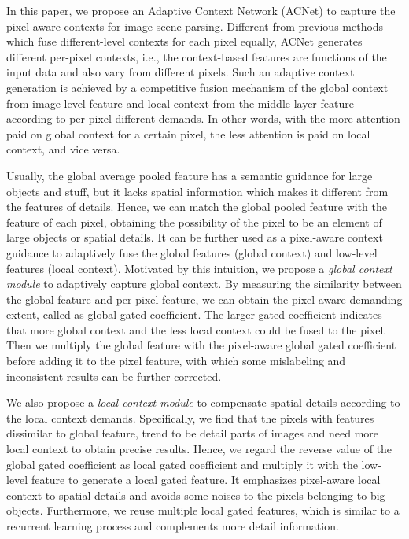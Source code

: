\documentclass[10pt,twocolumn,letterpaper]{article}
\begin{document}
In this paper, we propose an Adaptive Context Network (ACNet) to capture the pixel-aware contexts for image scene parsing. Different from previous methods which fuse different-level contexts for each pixel equally,
ACNet generates different per-pixel contexts, i.e., the context-based features are functions of the input data and also vary from different pixels. Such an adaptive context generation is achieved by a competitive fusion mechanism of the global context from image-level feature and local context from the middle-layer feature according to per-pixel different demands. In other words, with the more attention paid on global context for a certain pixel, the less attention is paid on local context, and vice versa. 

Usually, the global average pooled feature has a semantic guidance for large objects and stuff, but it lacks spatial information which makes it different from the features of details. Hence, we can match the global pooled feature with the feature of each pixel, obtaining the possibility of the pixel to be an element of large objects or spatial details. It can be further used as a pixel-aware context guidance to adaptively fuse the global features (global context) and low-level features (local context). 
Motivated by this intuition, we propose a \emph{global context module} to adaptively capture global context.  By measuring the similarity between the global feature and per-pixel feature, we can obtain the pixel-aware demanding extent, called as global gated coefficient. The larger gated coefficient indicates that more global context and the less local context could be fused to the pixel. Then we multiply the global feature with the pixel-aware global gated coefficient before adding it to the pixel feature, with which some mislabeling and inconsistent results can be further corrected. 



We also propose a \emph{local context module} to compensate spatial details according to the local context demands.
Specifically, we find that the pixels with features dissimilar to global feature, trend to be detail parts of images and need more local context to obtain precise results. Hence, we regard the reverse value of the  global gated coefficient as local gated coefficient and  multiply it with the low-level feature to generate a  local gated feature. It emphasizes pixel-aware local context to spatial details and avoids some noises to the pixels belonging to big objects. Furthermore, we reuse multiple  local gated features, which is similar to a recurrent learning process and complements more detail information.
\end{document}
